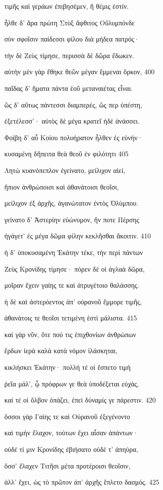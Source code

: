 τιμῆς καὶ γεράων ἐπιβησέμεν, ἣ θέμις ἐστίν.

ἦλθε δ' ἄρα πρώτη Στὺξ ἄφθιτος Οὔλυμπόνδε

σὺν σφοῖσιν παίδεσσι φίλου διὰ μήδεα πατρός· 

τὴν δὲ Ζεὺς τίμησε, περισσὰ δὲ δῶρα ἔδωκεν.

αὐτὴν μὲν γὰρ ἔθηκε θεῶν μέγαν ἔμμεναι ὅρκον, \num{400}

παῖδας δ' ἤματα πάντα ἑοῦ μεταναιέτας εἶναι.

ὣς δ' αὔτως πάντεσσι διαμπερές, ὥς περ ὑπέστη,

ἐξετέλεσσ'· αὐτὸς δὲ μέγα κρατεῖ ἠδὲ ἀνάσσει. 

Φοίβη δ' αὖ Κοίου πολυήρατον ἦλθεν ἐς εὐνήν· 

κυσαμένη δἤπειτα θεὰ θεοῦ ἐν φιλότητι \num{405} 

Λητὼ κυανόπεπλον ἐγείνατο, μείλιχον αἰεί,

ἤπιον ἀνθρώποισι καὶ ἀθανάτοισι θεοῖσι, 

μείλιχον ἐξ ἀρχῆς, ἀγανώτατον ἐντὸς Ὀλύμπου.

γείνατο δ' Ἀστερίην εὐώνυμον, ἥν ποτε Πέρσης

ἠγάγετ' ἐς μέγα δῶμα φίλην κεκλῆσθαι ἄκοιτιν. \num{410}

ἡ δ' ὑποκυσαμένη Ἑκάτην τέκε, τὴν περὶ πάντων 

Ζεὺς Κρονίδης τίμησε· πόρεν δέ οἱ ἀγλαὰ δῶρα, 

μοῖραν ἔχειν γαίης τε καὶ ἀτρυγέτοιο θαλάσσης.

ἡ δὲ καὶ ἀστερόεντος ἀπ' οὐρανοῦ ἔμμορε τιμῆς, 

ἀθανάτοις τε θεοῖσι τετιμένη ἐστὶ μάλιστα. \num{415}

καὶ γὰρ νῦν, ὅτε πού τις ἐπιχθονίων ἀνθρώπων

ἔρδων ἱερὰ καλὰ κατὰ νόμον ἱλάσκηται,

κικλήσκει Ἑκάτην· πολλή τέ οἱ ἔσπετο τιμὴ 

ῥεῖα μάλ', ᾧ πρόφρων γε θεὰ ὑποδέξεται εὐχάς,

καί τέ οἱ ὄλβον ὀπάζει, ἐπεὶ δύναμίς γε πάρεστιν. \num{420}

ὅσσοι γὰρ Γαίης τε καὶ Οὐρανοῦ ἐξεγένοντο

καὶ τιμὴν ἔλαχον, τούτων ἔχει αἶσαν ἁπάντων· 

οὐδέ τί μιν Κρονίδης ἐβιήσατο οὐδέ τ' ἀπηύρα,

ὅσσ' ἔλαχεν Τιτῆσι μέτα προτέροισι θεοῖσιν, 

ἀλλ' ἔχει, ὡς τὸ πρῶτον ἀπ' ἀρχῆς ἔπλετο δασμός. \num{425} 


